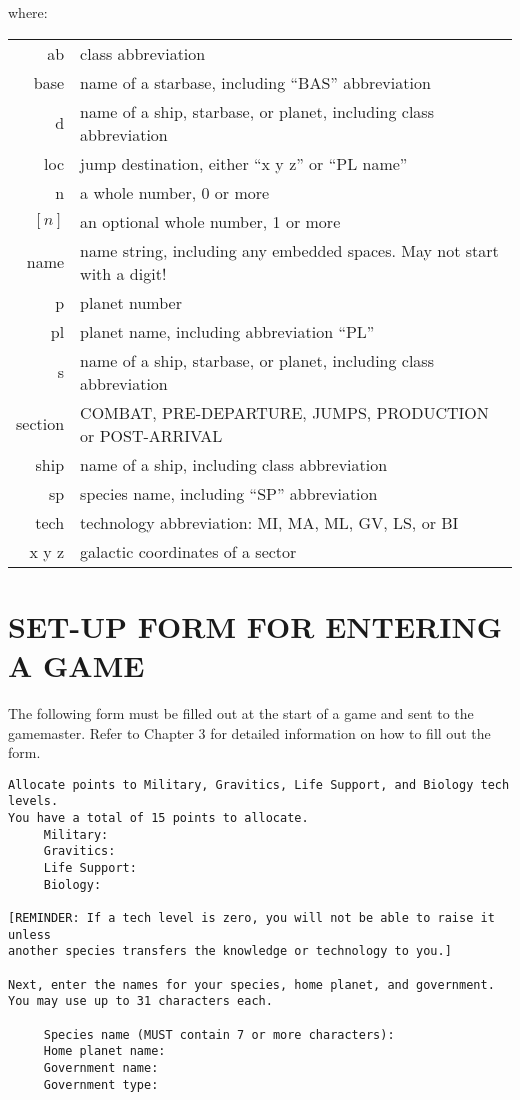 \documentclass[10pt,titlepage]{article}
\begin{document}
where:
\begin{tabular}{r@{ = }l}
	\noindent ab & class abbreviation \\
	base & name of a starbase, including ``BAS'' abbreviation \\
	d & name of a ship, starbase, or planet, including class abbreviation \\
	loc & jump destination, either ``x y z'' or ``PL name''  \\
	n & a whole number, 0 or more  \\
	$\left[n\right]$ & an optional whole number, 1 or more  \\
	name & name string, including any embedded spaces. May not start with a digit! \\
	p & planet number \\
	pl & planet name, including abbreviation ``PL'' \\
	s & name of a ship, starbase, or planet, including class abbreviation \\
	section & COMBAT, PRE-DEPARTURE, JUMPS, PRODUCTION or POST-ARRIVAL \\
	ship & name of a ship, including class abbreviation \\
	sp & species name, including ``SP'' abbreviation \\
	tech & technology abbreviation: MI, MA, ML, GV, LS, or BI \\
	x y z & galactic coordinates of a sector \\
\end{tabular}



\newpage

\section{SET-UP FORM FOR ENTERING A GAME}

The following form must be filled out at the start of a game and sent to the
gamemaster.  Refer to Chapter 3 for detailed information on how to fill out
the form.

\begin{verbatim}
Allocate points to Military, Gravitics, Life Support, and Biology tech levels.
You have a total of 15 points to allocate.
     Military:
     Gravitics:
     Life Support:
     Biology:

[REMINDER: If a tech level is zero, you will not be able to raise it unless
another species transfers the knowledge or technology to you.]

Next, enter the names for your species, home planet, and government.
You may use up to 31 characters each.

     Species name (MUST contain 7 or more characters):
     Home planet name:
     Government name:
     Government type:\end{verbatim} 
\end{document}
